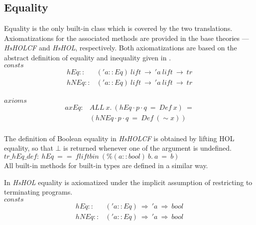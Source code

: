 \documentclass{llncs}
\begin{document}
\subsection{Equality}

Equality is the only built-in class which is covered by the two translations.
Axiomatizations for the associated methods are provided in the base theories
--- \emph{HsHOLCF} and \emph{HsHOL}, respectively. Both axiomatizations are
based on the abstract definition of equality and inequality given in
\cite{HaskellRep}.
\\

\noindent $consts$ 
$$ \begin{array}{ll}
hEq :: & ('a::Eq) \ lift \ \to \ 'a \ lift \ \to \ tr \\
hNEq :: & ('a::Eq) \ lift \ \to \ 'a \ lift \ \to \ tr\\
\end{array}$$

\noindent $axioms$ 
$$\begin{array}{ll}
axEq: & ALL \ x. \ (hEq \cdot p \cdot q \ = \ Def \ x) \ = \\
 & (hNEq \cdot p \cdot q \ = \ Def \ (\sim x)) \\
\end{array}$$

\noindent 
The definition of Boolean equality in \emph{HsHOLCF} is obtained by lifting
HOL equality, so that $\bot$ is returned whenever one of the argument is
undefined.
\\

\noindent $tr\_hEq\_def: \ hEq \ == \ fliftbin \ (\% (a::bool) \ b. \ a \ = \ b)$\\


\noindent 
All built-in methods for built-in types are defined in a similar way.

In \emph{HsHOL} equality is axiomatized under the implicit assumption of
restricting to terminating programs.
\\

\noindent $consts$ 
$$\begin{array}{ll}
  hEq :: & ('a::Eq) \ \Rightarrow \ 'a \ \Rightarrow \ bool \\
  hNEq :: & ('a::Eq) \ \Rightarrow \ 'a \ \Rightarrow \ bool \\
\end{array}$$
\end{document}
